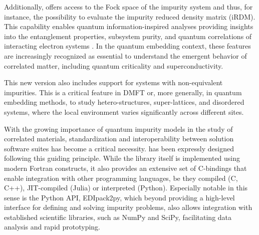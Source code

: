 \documentclass[edipack_sp.tex]{subfiles}
\begin{document}
Additionally, \NAME offers access to the Fock space of
the impurity system and thus, for instance, the possibility to evaluate the impurity reduced density matrix (iRDM). This capability enables quantum information-inspired analyses providing insights into the entanglement properties, subsystem purity, and quantum correlations of interacting electron systems \cite{Walsh2021PNAS,Bellomia2024PRB}.
In the quantum embedding context, these features are increasingly recognized as essential to understand the emergent behavior of correlated matter, including quantum criticality and superconductivity.

This new \NAME version also includes support for systems with non-equivalent impurities. This is a critical feature in DMFT or, more generally, in quantum embedding methods, to study hetero-structures, super-lattices, and disordered systems, where the local environment varies significantly across different sites.

With the growing importance of  quantum impurity models in the study of correlated materials, standardization and interoperability between solution software suites has
become a critical necessity.
\NAME has been expressly designed following this guiding principle. 
While the library itself is implemented using modern Fortran constructs, it also provides an extensive set of C-bindings that enable integration with other programming languages,
be they compiled (C, C++), JIT-compiled (Julia) or interpreted (Python).  
Especially notable in this sense is the Python API, EDIpack2py, which beyond providing a 
high-level interface for defining and solving impurity problems, also allows integration with established scientific libraries, such as NumPy and SciPy, facilitating data analysis and
rapid prototyping. 
\end{document}
